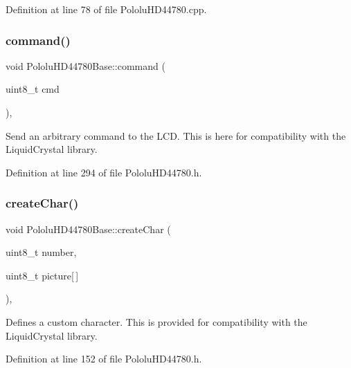 Definition at line 78 of file Pololu\+H\+D44780.\+cpp.

\mbox{\label{class_pololu_h_d44780_base_a449ad8d9ff7afb90667da0003a39af3b}} 
\subsubsection{\texorpdfstring{command()}{command()}}
{\footnotesize\ttfamily void Pololu\+H\+D44780\+Base\+::command (\begin{DoxyParamCaption}\item[{uint8\+\_\+t}]{cmd }\end{DoxyParamCaption})\hspace{0.3cm}{\ttfamily [inline]}, {\ttfamily [inherited]}}

Send an arbitrary command to the L\+CD. This is here for compatibility with the Liquid\+Crystal library. 

Definition at line 294 of file Pololu\+H\+D44780.\+h.

\mbox{\label{class_pololu_h_d44780_base_afd802cdc57783830acfe2415355d9f09}} 
\subsubsection{\texorpdfstring{create\+Char()}{createChar()}}
{\footnotesize\ttfamily void Pololu\+H\+D44780\+Base\+::create\+Char (\begin{DoxyParamCaption}\item[{uint8\+\_\+t}]{number,  }\item[{uint8\+\_\+t}]{picture\mbox{[}$\,$\mbox{]} }\end{DoxyParamCaption})\hspace{0.3cm}{\ttfamily [inline]}, {\ttfamily [inherited]}}

Defines a custom character. This is provided for compatibility with the Liquid\+Crystal library. 

Definition at line 152 of file Pololu\+H\+D44780.\+h.

\mbox{\label{class_pololu_h_d44780_base_a4fd53028d74561be579103d674aa8eab}} 

